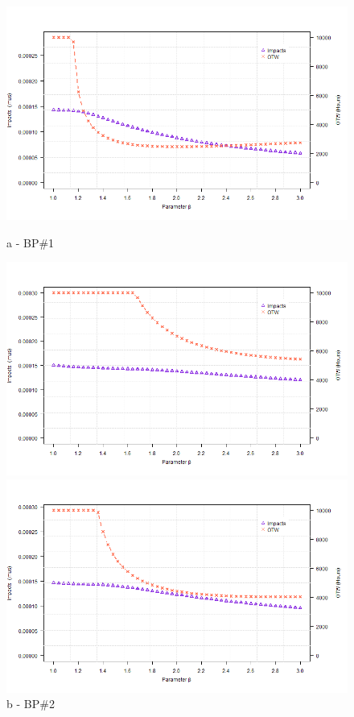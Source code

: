 \begin{figure}[!htb]
	\begin{minipage}[b]{0.5\linewidth}
		\centering
		\includegraphics[width=\textwidth]{figures/ch05_fig_betasa_pump1}
		\caption*{a - BP\#1}
	\end{minipage}
	\hspace{0.05cm}
	\begin{minipage}[b]{0.5\linewidth}
		\centering
		\includegraphics[width=\textwidth]{figures/ch05_fig_betasa_pump2}
		\caption*{b - BP\#2}
	\end{minipage}
	\hspace{0.05cm}
	\begin{minipage}[b]{0.5\linewidth}
		\centering
		\includegraphics[width=\textwidth]{figures/ch05_fig_betasa_pump3}

\end{minipage}
\end{figure}
